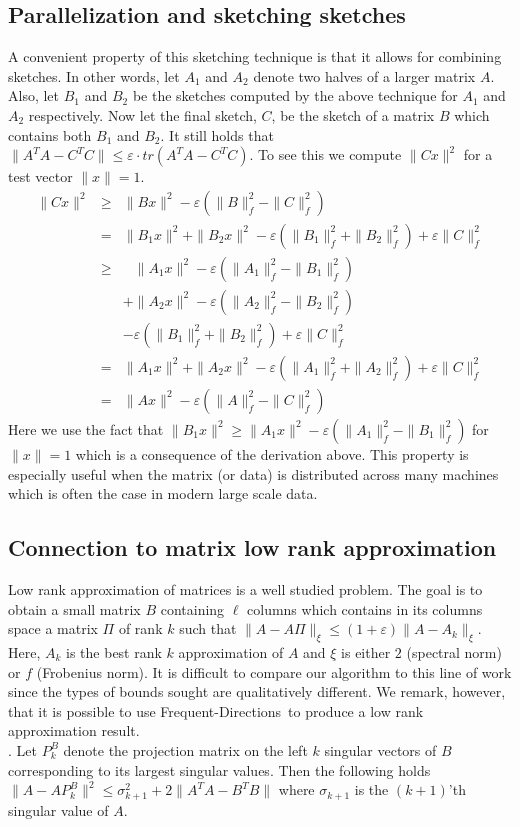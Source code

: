 \documentclass[]{article}
\newcommand{\eps}{\varepsilon}
\newcommand{\FD}{Frequent-Directions}
\begin{document}
\subsection{Parallelization and sketching sketches}
A convenient property of this sketching technique is that it allows for combining sketches.
In other words, let $A_1$ and $A_2$ denote two halves of a larger matrix $A$. 
Also, let $B_1$ and $B_2$ be the sketches computed by the above technique for $A_1$ and $A_2$ respectively.
Now let the final sketch, $C$, be the sketch of a matrix  $B$ which contains both $B_1$ and $B_2$.
It still holds that $\|A^{T}A - C^{T}C\| \le \eps\cdot tr(A^{T}A - C^{T}C)$.
To see this we compute $\|Cx\|^2$ for a test vector $\|x\| = 1$.
\begin{eqnarray*}
\|Cx\|^2 &\ge& \|Bx\|^{2} - \eps (\|B\|_{f}^{2} - \|C\|_{f}^{2}) \\
&=& \|B_{1}x\|^2 + \|B_{2}x\|^2  - \eps (\|B_1\|_{f}^{2} +\|B_2\|_{f}^{2}) +  \eps \|C\|_{f}^{2}\\
&\ge& \;\,\,\, \|A_{1}x\|^2 - \eps (\|A_{1}\|_{f}^2 - \|B_{1}\|_{f}^{2}) \\
&& +\|A_{2}x\|^2 - \eps  (\|A_{2}\|_{f}^2 - \|B_{2}\|_{f}^{2}) \\ 
&& - \eps (\|B_1\|_{f}^{2} +\|B_2\|_{f}^{2}) + \eps \|C\|_{f}^{2} \\
&=& \|A_{1}x\|^2 + \|A_{2}x\|^2 - \eps (\|A_{1}\|_{f}^2 + \|A_{2}\|_{f}^2) + \eps \|C\|_{f}^{2}\\
&=& \|Ax\|^{2} - \eps  (\|A\|_{f}^2 -\|C\|_{f}^{2})
\end{eqnarray*}
Here we use the fact that $\|B_{1}x\|^{2} \ge \|A_{1}x\|^{2}  - \eps (\|A_{1}\|_{f}^{2}- \|B_{1}\|_{f}^2) $ for $\|x\|=1$ which is a consequence of the derivation above.
This property is especially useful when the matrix (or data) is distributed across many machines which is often the case in modern large scale data.

\subsection{Connection to matrix low rank approximation}
Low rank approximation of matrices is a well studied problem.
The goal is to obtain a small matrix $B$ containing $\ell$ columns 
which contains in its columns space a matrix $\Pi$ of rank $k$ such that $\|A - A \Pi\|_{\xi} \le (1+\eps)\|A - A_k\|_\xi$.
Here, $A_k$ is the best rank $k$ approximation of $A$ and $\xi$ is either $2$ (spectral norm) or $f$ (Frobenius norm). 
It is difficult to compare our algorithm to this line of work since the types of bounds sought are qualitatively different.
We remark, however, that it is possible to use \FD~to produce a low rank approximation result.\\
.
Let $P^{B}_{k}$ denote the projection matrix on the left $k$ singular vectors of $B$ corresponding to its largest singular values.
Then the following holds $\|A - AP^{B}_{k}\|^2 \le \sigma^{2}_{k+1} + 2\|A^{T}A - B^{T}B\|$ where $\sigma_{k+1}$ is the $(k+1)$'th
singular value of $A$.
\end{document}
